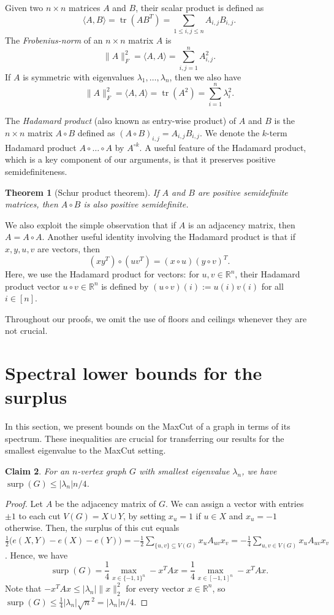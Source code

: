 \documentclass[11pt]{article}
\theoremstyle{plain}
\newtheorem{theorem}{Theorem}[section]
\newtheorem{claim}[theorem]{Claim}
\theoremstyle{definition}
\DeclareMathOperator{\surp}{surp}
\DeclareMathOperator{\trace}{tr}
\newcommand{\bR}{\mathbb{R}}
\begin{document}
Given two $n\times n$ matrices $A$ and $B$, their scalar product is defined as $$\langle A,B\rangle=\trace(AB^T)=\sum_{1\leq i,j\leq n} A_{i,j}B_{i,j}.$$
The \emph{Frobenius-norm} of an $n\times n$ matrix $A$ is
$$\|A\|_F^2=\langle A,A\rangle=\sum_{i,j=1}^{n}A_{i,j}^2.$$
If $A$ is symmetric with eigenvalues  $\lambda_1,\dots,\lambda_n$, then we also have $$\|A\|_F^2= \langle A,A\rangle = \trace(A^2)=\sum_{i=1}^n\lambda_i^2.$$

The \emph{Hadamard product} (also known as entry-wise product) of $A$ and $B$ is the $n\times n$ matrix $A\circ B$ defined as $(A\circ B)_{i,j}=A_{i,j}B_{i,j}$. We denote the $k$-term Hadamard product $A\circ\dots\circ A$ by $A^{\circ k}$. A useful feature of the Hadamard product, which is a key component of our arguments, is that it preserves positive semidefiniteness.
\begin{theorem}[Schur product theorem] \label{theorem: schur}
If $A$ and $B$ are positive semidefinite matrices, then $A\circ B$ is also positive semidefinite.
\end{theorem}
We also exploit the simple observation that if $A$ is an adjacency matrix, then $A=A\circ A$. Another useful identity involving the Hadamard product is that if $x,y,u,v$ are vectors, then $$(xy^T)\circ(uv^T)=(x\circ u) (y\circ v)^T.$$
Here, we use the Hadamard product for vectors: for $u,v \in \mathbb{R}^n$, their Hadamard product vector $u\circ v \in \mathbb{R}^{n}$ is defined by $(u\circ v)(i):=u(i)v(i)$ for all $i \in [n]$.

Throughout our proofs, we omit the use of floors and ceilings whenever they are not crucial. 

\section{Spectral lower bounds for the surplus}\label{sect:MaxCut}

In this section, we present bounds on the MaxCut of a graph in terms of its spectrum. These inequalities are crucial for transferring our results for the smallest eigenvalue to the MaxCut setting.

\begin{claim}\label{claim:surplus_and_lambdan}
For an $n$-vertex graph $G$ with smallest eigenvalue $\lambda_n$, we have $\surp(G)\leq |\lambda_n|n/4$. 
\end{claim}
\begin{proof}
Let $A$ be the adjacency matrix of $G$. We can assign a vector with entries $\pm 1$ to each cut $V(G)=X\cup Y$, by setting $x_u=1$ if $u\in X$ and $x_u=-1$ otherwise. Then, the surplus of this cut equals $\frac{1}{2}\big(e(X, Y)-e(X)-e(Y)\big)=-\frac{1}{2}\sum_{\{u, v\}\subseteq V(G)} x_uA_{uv}x_v=-\frac{1}{4}\sum_{u, v\in V(G)} x_uA_{uv}x_v$. 
Hence, we have 
\[\surp(G)=\frac{1}{4}\max_{x\in \{-1,1\}^n}-x^T Ax=\frac{1}{4}\max_{x\in [-1,1]^n}-x^T Ax.\]
Note that $-x^TAx\leq |\lambda_n|\|x\|_2^2$ for every vector $x\in \bR^n$, so $\surp(G)\leq \frac{1}{4} |\lambda_n| \sqrt{n}^2=|\lambda_n|n/4$.
\end{proof}
\end{document}
